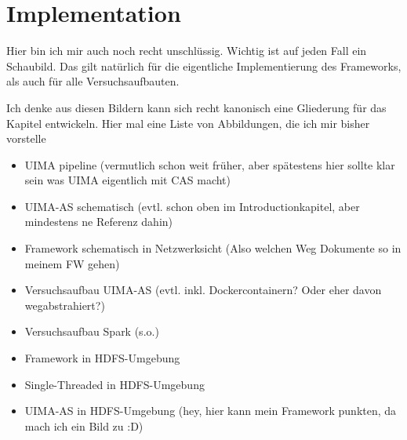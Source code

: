\chapter{Implementation}

Hier bin ich mir auch noch recht unschlüssig. Wichtig ist auf jeden Fall ein Schaubild. Das gilt natürlich für die eigentliche Implementierung des Frameworks, als auch für alle Versuchsaufbauten.

Ich denke aus diesen Bildern kann sich recht kanonisch eine Gliederung für das Kapitel entwickeln. Hier mal eine Liste von Abbildungen, die ich mir bisher vorstelle

\begin{itemize}
\item UIMA pipeline (vermutlich schon weit früher, aber spätestens hier sollte klar sein was UIMA eigentlich mit CAS macht)
\item UIMA-AS schematisch (evtl. schon oben im Introductionkapitel, aber mindestens ne Referenz dahin)
\item Framework schematisch in Netzwerksicht (Also welchen Weg Dokumente so in meinem FW gehen)
\item Versuchsaufbau UIMA-AS (evtl. inkl. Dockercontainern? Oder eher davon wegabstrahiert?)
\item Versuchsaufbau Spark (s.o.)
\item Framework in HDFS-Umgebung
\item Single-Threaded in HDFS-Umgebung
\item UIMA-AS in HDFS-Umgebung (hey, hier kann mein Framework punkten, da mach ich ein Bild zu :D)

\end{itemize}
